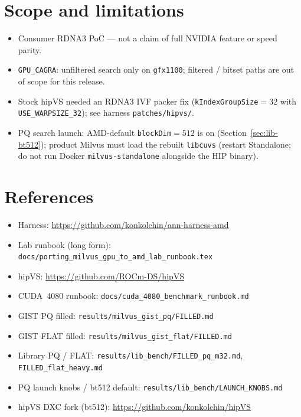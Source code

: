 \documentclass[11pt,a4paper]{article}
\begin{document}
\section{Scope and limitations}
\label{sec:scope}

\begin{itemize}[leftmargin=*]
  \item Consumer RDNA3 PoC --- not a claim of full NVIDIA feature or speed parity.
  \item \texttt{GPU\_CAGRA}: unfiltered search only on \texttt{gfx1100}; filtered /
        bitset paths are out of scope for this release.
  \item Stock hipVS needed an RDNA3 IVF packer fix (\texttt{kIndexGroupSize}${=}32$
        with \texttt{USE\_WARPSIZE\_32}); see harness \texttt{patches/hipvs/}.
  \item PQ search launch: AMD-default \texttt{blockDim}${=}512$ is on
        (Section~\ref{sec:lib-bt512}); product Milvus must load the rebuilt
        \texttt{libcuvs} (restart Standalone; do not run Docker
        \texttt{milvus-standalone} alongside the HIP binary).
\end{itemize}

\section{References}
\label{sec:refs}

\begin{itemize}[leftmargin=*]
  \item Harness: \url{https://github.com/konkolchin/ann-harness-amd}
  \item Lab runbook (long form): \texttt{docs/porting\_milvus\_gpu\_to\_amd\_lab\_runbook.tex}
  \item hipVS: \url{https://github.com/ROCm-DS/hipVS}
  \item CUDA~4080 runbook: \texttt{docs/cuda\_4080\_benchmark\_runbook.md}
  \item GIST PQ filled: \texttt{results/milvus\_gist\_pq/FILLED.md}
  \item GIST FLAT filled: \texttt{results/milvus\_gist\_flat/FILLED.md}
  \item Library PQ / FLAT: \texttt{results/lib\_bench/FILLED\_pq\_m32.md},
        \texttt{FILLED\_flat\_heavy.md}
  \item PQ launch knobs / bt512 default: \texttt{results/lib\_bench/LAUNCH\_KNOBS.md}
  \item hipVS DXC fork (bt512): \url{https://github.com/konkolchin/hipVS}
\end{itemize}
\end{document}
